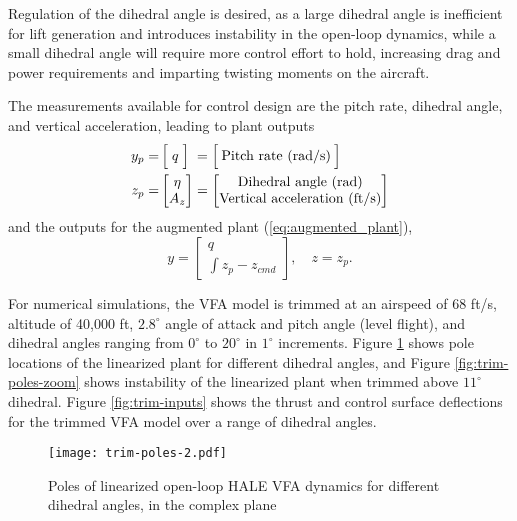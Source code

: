 Regulation of the dihedral angle is desired, as a large dihedral angle is inefficient for lift generation and introduces instability in the open-loop dynamics, while a small dihedral angle will require more control effort to hold, increasing drag and power requirements and imparting twisting moments on the aircraft. 

The measurements available for control design are the pitch rate, dihedral angle, and vertical acceleration, leading to plant outputs
\begin{equation}
\begin{aligned}
y_p =& \, \Big[\; q \; \Big] \;= \Big[\: \text{Pitch rate (rad/s)} \:\Big] \\
z_p =& \begin{bmatrix}
\eta \\
A_z
\end{bmatrix} =\begin{bmatrix}
	$Dihedral angle (rad)$\\
	$Vertical acceleration (ft/s)$
\end{bmatrix}		
\end{aligned}
\end{equation}
and the outputs for the augmented plant (\ref{eq:augmented_plant}),
\begin{equation}
y = \begin{bmatrix}
	q \\ \int{z_p - z_{cmd}}
\end{bmatrix}, \quad z = z_p.
\end{equation}

For numerical simulations, the VFA model is trimmed at an airspeed of $68$ ft/s, altitude of 40,000 ft, $2.8^\circ$ angle of attack and pitch angle (level flight), and dihedral angles ranging from $0^\circ$ to $20^\circ$ in $1^\circ$ increments. Figure \ref{fig:trim-poles} shows pole locations of the linearized plant for different dihedral angles, and Figure \ref{fig:trim-poles-zoom} shows instability of the linearized plant when trimmed above $11^\circ$ dihedral. Figure \ref{fig:trim-inputs} shows the thrust and control surface deflections for the trimmed VFA model over a range of dihedral angles.

\begin{figure}[htbp]
	\centering
	\texttt{[image: trim-poles-2.pdf]}
	\caption{Poles of linearized open-loop HALE VFA dynamics for different dihedral angles, in the complex plane}
	\label{fig:trim-poles}
\end{figure}

